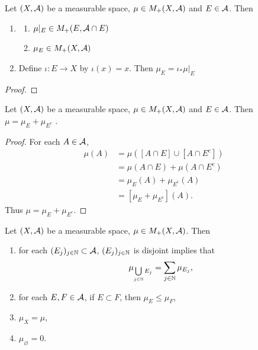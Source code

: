 \documentclass{book}
\begin{document}

	\begin{ex}  
		Let $(X, \mathcal{A})$ be a measurable space, $\mu \in M_+(X, \mathcal{A})$ and $E \in \mathcal{A}$. Then 
		\begin{enumerate}
			\item \begin{enumerate}
				\item $\mu|_E \in M_+(E, \mathcal{A} \cap E)$
				\item $\mu_E \in M_+(X, \mathcal{A})$
			\end{enumerate}
			\item Define $\iota: E \rightarrow X$ by $\iota(x) = x$. Then $\mu_E = \iota_*\mu|_E$
		\end{enumerate} 
	\end{ex}

	\begin{proof}
	\end{proof}

	\begin{ex}  
		Let $(X, \mathcal{A})$ be a measurable space, $\mu \in M_+(X, \mathcal{A})$ and $E \in \mathcal{A}$. Then $\mu = \mu_E + \mu_{E^c}$ .
	\end{ex}
	
	\begin{proof}
		For each $A \in \mathcal{A}$, 
		\begin{align*}
			\mu(A)
			& = \mu([A \cap E] \cup [A \cap E^c]) \\
			& = \mu(A \cap E) + \mu(A \cap E^c) \\
			& = \mu_E(A) + \mu_{E^c}(A) \\
			& = [\mu_E + \mu_{E^c}](A).
		\end{align*}
		Thus $\mu = \mu_E + \mu_{E^c}$. 
	\end{proof}

	\begin{ex} 
		Let $(X, \mathcal{A})$ be a measurable space, $\mu \in M_+(X, \mathcal{A})$. Then 
		\begin{enumerate}
			\item for each $(E_j)_{j \in \mathbb{N}} \subset \mathcal{A}$, $(E_j)_{j \in \mathbb{N}}$ is disjoint implies that  
			$$\mu_{\bigcup\limits_{j \in \mathbb{N}} E_j} = \sum\limits_{j \in \mathbb{N}} \mu_{E_j},$$
			\item for each $E,F \in \mathcal{A}$, if $E \subset F$, then $\mu_E \leq \mu_F$,
			\item $\mu_X = \mu$,
			\item $\mu_{\varnothing} = 0$.
		\end{enumerate}
	\end{ex}
\end{document}
